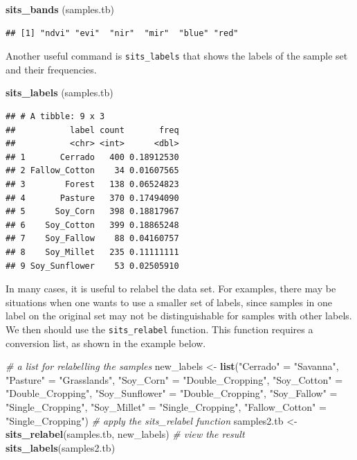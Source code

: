 \documentclass[11pt,]{article}
\newenvironment{Shaded}{\begin{snugshade}}{\end{snugshade}}
\newcommand{\KeywordTok}[1]{\textcolor[rgb]{0.13,0.29,0.53}{\textbf{#1}}}
\newcommand{\StringTok}[1]{\textcolor[rgb]{0.31,0.60,0.02}{#1}}
\newcommand{\CommentTok}[1]{\textcolor[rgb]{0.56,0.35,0.01}{\textit{#1}}}
\newcommand{\NormalTok}[1]{#1}
\begin{document}
\begin{Shaded}
\begin{Highlighting}[]
\KeywordTok{sits_bands}\NormalTok{ (samples.tb)}
\end{Highlighting}
\end{Shaded}

\begin{verbatim}
## [1] "ndvi" "evi"  "nir"  "mir"  "blue" "red"
\end{verbatim}

Another useful command is \texttt{sits\_labels} that shows the labels of
the sample set and their frequencies.

\begin{Shaded}
\begin{Highlighting}[]
\KeywordTok{sits_labels}\NormalTok{ (samples.tb)}
\end{Highlighting}
\end{Shaded}

\begin{verbatim}
## # A tibble: 9 x 3
##           label count       freq
##           <chr> <int>      <dbl>
## 1       Cerrado   400 0.18912530
## 2 Fallow_Cotton    34 0.01607565
## 3        Forest   138 0.06524823
## 4       Pasture   370 0.17494090
## 5      Soy_Corn   398 0.18817967
## 6    Soy_Cotton   399 0.18865248
## 7    Soy_Fallow    88 0.04160757
## 8    Soy_Millet   235 0.11111111
## 9 Soy_Sunflower    53 0.02505910
\end{verbatim}

In many cases, it is useful to relabel the data set. For examples, there
may be situations when one wants to use a smaller set of labels, since
samples in one label on the original set may not be distinguishable for
samples with other labels. We then should use the \texttt{sits\_relabel}
function. This function requires a conversion list, as shown in the
example below.

\begin{Shaded}
\begin{Highlighting}[]
\CommentTok{# a list for relabelling the samples}
\NormalTok{new_labels <-}\StringTok{ }\KeywordTok{list}\NormalTok{(}\StringTok{"Cerrado"}\NormalTok{       =}\StringTok{ "Savanna"}\NormalTok{, }
                   \StringTok{"Pasture"}\NormalTok{       =}\StringTok{ "Grasslands"}\NormalTok{, }
                   \StringTok{"Soy_Corn"}\NormalTok{      =}\StringTok{ "Double_Cropping"}\NormalTok{,}
                   \StringTok{"Soy_Cotton"}\NormalTok{    =}\StringTok{ "Double_Cropping"}\NormalTok{,}
                   \StringTok{"Soy_Sunflower"}\NormalTok{ =}\StringTok{ "Double_Cropping"}\NormalTok{,}
                   \StringTok{"Soy_Fallow"}\NormalTok{    =}\StringTok{ "Single_Cropping"}\NormalTok{,}
                   \StringTok{"Soy_Millet"}\NormalTok{    =}\StringTok{ "Single_Cropping"}\NormalTok{,}
                   \StringTok{"Fallow_Cotton"}\NormalTok{ =}\StringTok{ "Single_Cropping"}\NormalTok{)}
\CommentTok{# apply the sits_relabel function}
\NormalTok{samples2.tb <-}\StringTok{ }\KeywordTok{sits_relabel}\NormalTok{(samples.tb, new_labels)}
\CommentTok{# view the result}
\KeywordTok{sits_labels}\NormalTok{(samples2.tb)}
\end{Highlighting}
\end{Shaded}
\end{document}
